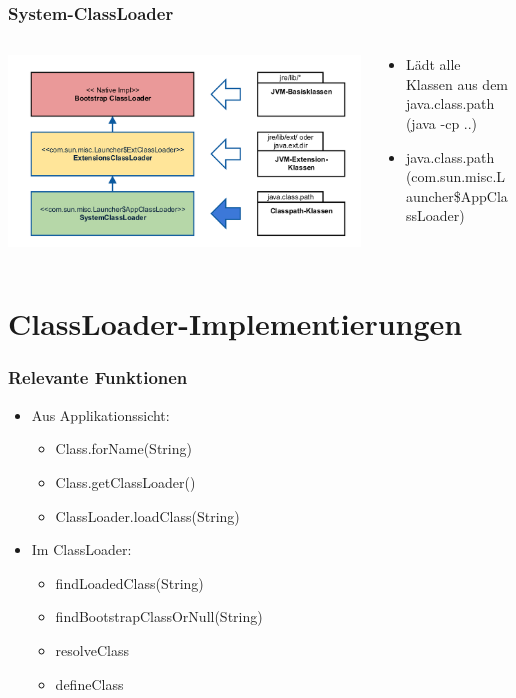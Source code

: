 \documentclass[aspectratio=169]{beamer}
\begin{document}
\begin{frame}
	\frametitle{System-ClassLoader}
	\begin{columns}[T] 
	\begin{column}{.46\textwidth}
		\includegraphics[scale=0.06]{assets/classloader-hierachie-system-active.png} 
	\end{column}
	\hfill
	\begin{column}{.56\textwidth}

	\begin{itemize}
		\item{Lädt alle Klassen aus dem java.class.path (java -cp ..)}
		\item{java.class.path (com.sun.misc.Launcher\$AppClassLoader)}
	\end{itemize}

	\end{column}
	\end{columns}
\end{frame}

\section{ClassLoader-Implementierungen}

\begin{frame}
	\frametitle{Relevante Funktionen}
	\begin{itemize}
		\item{Aus Applikationssicht:}
			\begin{itemize}
				\item{Class.forName(String)}
				\item{Class.getClassLoader()}
				\item{ClassLoader.loadClass(String)}
			\end{itemize}
		\item{Im ClassLoader:}
			\begin{itemize}
				\item{findLoadedClass(String)}
				\item{findBootstrapClassOrNull(String)}
				\item{resolveClass}
				\item{defineClass}
			\end{itemize}
	\end{itemize}
\end{frame}
\end{document}
